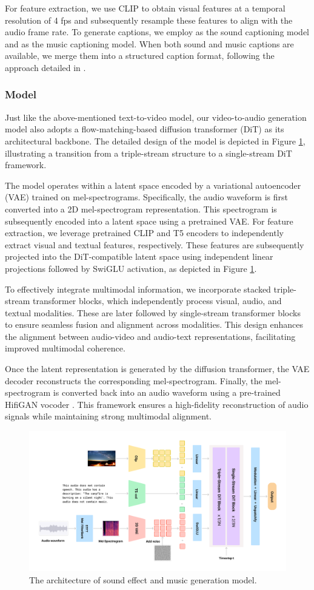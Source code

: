 For feature extraction, we use CLIP \cite{clip} to obtain visual features at a temporal resolution of 4 fps and subsequently resample these features to align with the audio frame rate. To generate captions, we employ \cite{haji2024taming} as the sound captioning model and \cite{doh2023lp} as the music captioning model. When both sound and music captions are available, we merge them into a structured caption format, following the approach detailed in \cite{polyak2024movie}.

\subsubsection{Model}
Just like the above-mentioned text-to-video model, our video-to-audio generation model also adopts a flow-matching-based diffusion transformer (DiT) as its architectural backbone. The detailed design of the model is depicted in Figure \ref{fig:audio-gen}, illustrating a transition from a triple-stream structure to a single-stream DiT framework.

The model operates within a latent space encoded by a variational autoencoder (VAE) trained on mel-spectrograms. Specifically, the audio waveform is first converted into a 2D mel-spectrogram representation. This spectrogram is subsequently encoded into a latent space using a pretrained VAE. For feature extraction, we leverage pretrained CLIP \cite{clip} and T5 \cite{raffel2020exploring} encoders to independently extract visual and textual features, respectively. These features are subsequently projected into the DiT-compatible latent space using independent linear projections followed by SwiGLU activation, as depicted in Figure \ref{fig:audio-gen}.

To effectively integrate multimodal information, we incorporate stacked triple-stream transformer blocks, which independently process visual, audio, and textual modalities. These are later followed by single-stream transformer blocks to ensure seamless fusion and alignment across modalities. This design enhances the alignment between audio-video and audio-text representations, facilitating improved multimodal coherence.

Once the latent representation is generated by the diffusion transformer, the VAE decoder reconstructs the corresponding mel-spectrogram. Finally, the mel-spectrogram is converted back into an audio waveform using a pre-trained HifiGAN vocoder \cite{kong2020hifi}. This framework ensures a high-fidelity reconstruction of audio signals while maintaining strong multimodal alignment.

\begin{figure}[t]
    \centering
    \includegraphics[width=0.9\linewidth]{figures/vt2a_arch.png}
    \caption{The architecture of sound effect and music generation model. }
    \label{fig:audio-gen}
\end{figure}